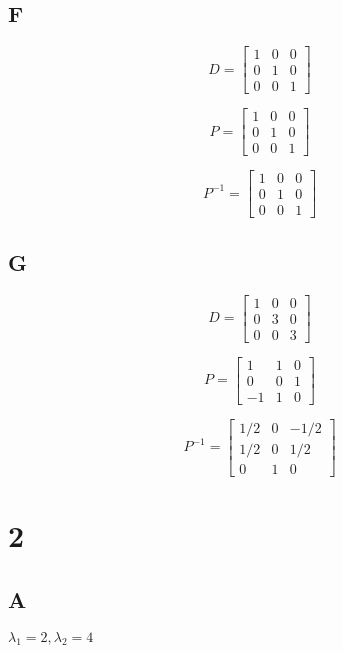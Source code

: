 \documentclass{article}
\begin{document}
\subsection*{F}

\[D = \begin{bmatrix} 1 & 0 & 0 \\ 0 & 1 & 0 \\ 0 & 0 & 1 \end{bmatrix}\]

\[P = \begin{bmatrix} 1 & 0 & 0 \\ 0 & 1 & 0 \\ 0 & 0 & 1 \end{bmatrix}\]

\[P^{-1} = \begin{bmatrix} 1 & 0 & 0 \\ 0 & 1 & 0 \\ 0 & 0 & 1 \end{bmatrix}\]

\subsection*{G}

\[D = \begin{bmatrix} 1 & 0 & 0 \\ 0 & 3 & 0 \\ 0 & 0 & 3 \end{bmatrix}\]

\[P = \begin{bmatrix} 1 & 1 & 0 \\ 0 & 0 & 1 \\ -1 & 1 & 0 \end{bmatrix}\]

\[P^{-1} = \begin{bmatrix} 1/2 & 0 & -1/2 \\ 1/2 & 0 & 1/2 \\ 0 & 1 & 0 \end{bmatrix}\]

\section*{2}

\subsection*{A}

$\lambda_1 = 2, \lambda_2 = 4$
\end{document}
